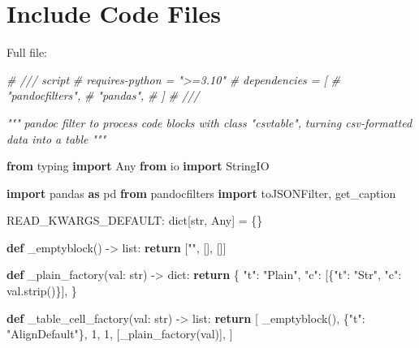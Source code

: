 \documentclass[
]{article}
\newenvironment{Shaded}{}{}
\newcommand{\BuiltInTok}[1]{\textcolor[rgb]{0.00,0.50,0.00}{#1}}
\newcommand{\CommentTok}[1]{\textcolor[rgb]{0.38,0.63,0.69}{\textit{#1}}}
\newcommand{\ControlFlowTok}[1]{\textcolor[rgb]{0.00,0.44,0.13}{\textbf{#1}}}
\newcommand{\DecValTok}[1]{\textcolor[rgb]{0.25,0.63,0.44}{#1}}
\newcommand{\ImportTok}[1]{\textcolor[rgb]{0.00,0.50,0.00}{\textbf{#1}}}
\newcommand{\KeywordTok}[1]{\textcolor[rgb]{0.00,0.44,0.13}{\textbf{#1}}}
\newcommand{\NormalTok}[1]{#1}
\newcommand{\OperatorTok}[1]{\textcolor[rgb]{0.40,0.40,0.40}{#1}}
\newcommand{\StringTok}[1]{\textcolor[rgb]{0.25,0.44,0.63}{#1}}
\begin{document}
\section{Include Code Files}\label{include-code-files}

Full file:

\begin{Shaded}
\begin{Highlighting}[]
\CommentTok{\# /// script}
\CommentTok{\# requires{-}python = "\textgreater{}=3.10"}
\CommentTok{\# dependencies = [}
\CommentTok{\#     "pandocfilters",}
\CommentTok{\#     "pandas",}
\CommentTok{\# ]}
\CommentTok{\# ///}

\CommentTok{"""}
\CommentTok{pandoc filter to process code blocks with class "csvtable",}
\CommentTok{turning csv{-}formatted data into a table}
\CommentTok{"""}

\ImportTok{from}\NormalTok{ typing }\ImportTok{import}\NormalTok{ Any}
\ImportTok{from}\NormalTok{ io }\ImportTok{import}\NormalTok{ StringIO}

\ImportTok{import}\NormalTok{ pandas }\ImportTok{as}\NormalTok{ pd}
\ImportTok{from}\NormalTok{ pandocfilters }\ImportTok{import}\NormalTok{ toJSONFilter, get\_caption}


\NormalTok{READ\_KWARGS\_DEFAULT: }\BuiltInTok{dict}\NormalTok{[}\BuiltInTok{str}\NormalTok{, Any] }\OperatorTok{=}\NormalTok{ \{\}}


\KeywordTok{def}\NormalTok{ \_emptyblock() }\OperatorTok{{-}\textgreater{}} \BuiltInTok{list}\NormalTok{:}
    \ControlFlowTok{return}\NormalTok{ [}\StringTok{""}\NormalTok{, [], []]}


\KeywordTok{def}\NormalTok{ \_plain\_factory(val: }\BuiltInTok{str}\NormalTok{) }\OperatorTok{{-}\textgreater{}} \BuiltInTok{dict}\NormalTok{:}
    \ControlFlowTok{return}\NormalTok{ \{}
        \StringTok{"t"}\NormalTok{: }\StringTok{"Plain"}\NormalTok{,}
        \StringTok{"c"}\NormalTok{: [\{}\StringTok{"t"}\NormalTok{: }\StringTok{"Str"}\NormalTok{, }\StringTok{"c"}\NormalTok{: val.strip()\}],}
\NormalTok{    \}}


\KeywordTok{def}\NormalTok{ \_table\_cell\_factory(val: }\BuiltInTok{str}\NormalTok{) }\OperatorTok{{-}\textgreater{}} \BuiltInTok{list}\NormalTok{:}
    \ControlFlowTok{return}\NormalTok{ [}
\NormalTok{        \_emptyblock(),}
\NormalTok{        \{}\StringTok{"t"}\NormalTok{: }\StringTok{"AlignDefault"}\NormalTok{\},}
        \DecValTok{1}\NormalTok{,}
        \DecValTok{1}\NormalTok{,}
\NormalTok{        [\_plain\_factory(val)],}
\NormalTok{    ]}



\end{Highlighting}
\end{Shaded}
\end{document}
